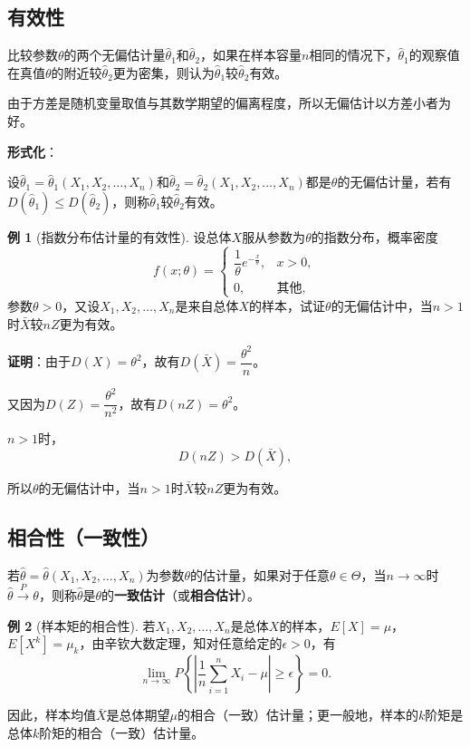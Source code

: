 \documentclass[11pt,a4paper]{report}
\theoremstyle{definition}
\newtheorem{example}{例}[chapter]
\begin{document}
\subsection{有效性}

比较参数$\theta$的两个无偏估计量$\hat{\theta}_{1}$和$\hat{\theta}_{2}$，如果在样本容量$n$相同的情况下，$\hat{\theta}_{1}$的观察值在真值$\theta$的附近较$\hat{\theta}_{2}$更为密集，则认为$\hat{\theta}_{1}$较$\hat{\theta}_{2}$有效。

由于方差是随机变量取值与其数学期望的偏离程度，所以无偏估计以方差小者为好。

\textbf{形式化}：

设$\hat{\theta}_{1}=\hat{\theta}_{1}(X_{1},X_{2},\ldots,X_{n})$和$\hat{\theta}_{2}=\hat{\theta}_{2}(X_{1},X_{2},\ldots,X_{n})$都是$\theta$的无偏估计量，若有$D(\hat{\theta}_{1})\leq D(\hat{\theta}_{2})$，则称$\hat{\theta}_{1}$较$\hat{\theta}_{2}$有效。

\begin{example}[指数分布估计量的有效性]
设总体$X$服从参数为$\theta$的指数分布，概率密度
\[
f(x;\theta)=
\begin{cases}
\dfrac{1}{\theta}e^{-\frac{x}{\theta}}, & x>0,\\[0.5em]
0, & \text{其他},
\end{cases}
\]
参数$\theta>0$，又设$X_{1},X_{2},\ldots,X_{n}$是来自总体$X$的样本，试证$\theta$的无偏估计中，当$n>1$时$\bar{X}$较$nZ$更为有效。

\textbf{证明}：由于$D(X)=\theta^{2}$，故有$D(\bar{X})=\dfrac{\theta^{2}}{n}$。

又因为$D(Z)=\dfrac{\theta^{2}}{n^{2}}$，故有$D(nZ)=\theta^{2}$。

$n>1$时，
\[
D(nZ)>D(\bar{X}),
\]

所以$\theta$的无偏估计中，当$n>1$时$\bar{X}$较$nZ$更为有效。
\end{example}

\subsection{相合性（一致性）}

若$\hat{\theta}=\hat{\theta}(X_{1},X_{2},\ldots,X_{n})$为参数$\theta$的估计量，如果对于任意$\theta\in\Theta$，当$n\to\infty$时$\hat{\theta}\stackrel{P}{\longrightarrow}\theta$，则称$\hat{\theta}$是$\theta$的\textbf{一致估计}（或\textbf{相合估计}）。

\begin{example}[样本矩的相合性]
若$X_{1},X_{2},\ldots,X_{n}$是总体$X$的样本，$E[X]=\mu$，$E[X^{k}]=\mu_{k}$，由辛钦大数定理，知对任意给定的$\epsilon>0$，有
\[
\lim_{n\to\infty}P\left\{\left|\frac{1}{n}\sum_{i=1}^{n}X_{i}-\mu\right|\geq\epsilon\right\}=0.
\]

因此，样本均值$\bar{X}$是总体期望$\mu$的相合（一致）估计量；更一般地，样本的$k$阶矩是总体$k$阶矩的相合（一致）估计量。
\end{example}
\end{document}
